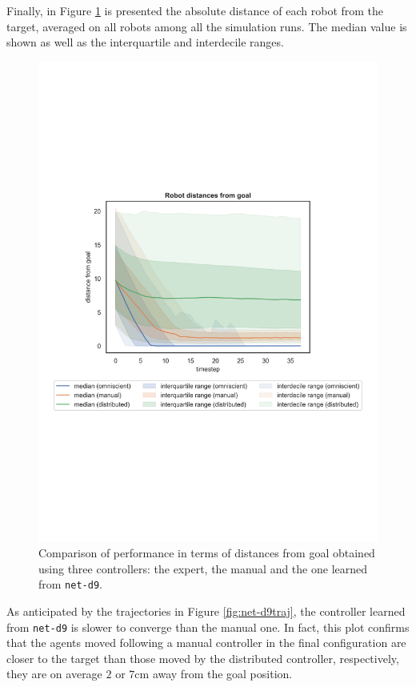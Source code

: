 Finally, in Figure \ref{fig:net-d9distance} is presented the absolute distance of 
each robot from the target, averaged on all robots among all the simulation runs. 
The median value is shown as well as the interquartile and interdecile ranges.
\begin{figure}[!htb]
	\centering
	\includegraphics[width=.63\textwidth]{contents/images/net-d9/distances-from-goal-compressed-distributed}%
	\caption[Evaluation of \texttt{net-d9} distances from goal.]{Comparison of 
		performance in terms of distances from goal obtained using three 
		controllers: the expert, the manual and the one learned from \texttt{net-d9}.}
	\label{fig:net-d9distance}
\end{figure}
As anticipated by the trajectories in Figure \ref{fig:net-d9traj}, the controller 
learned from \texttt{net-d9} is slower to converge than the manual one. In fact, 
this plot confirms that the agents moved following a manual controller in the final 
configuration are closer to the target than those moved by the distributed 
controller, respectively, they are on average $2$ or $7$\gls{cm} away from the 
goal position.

